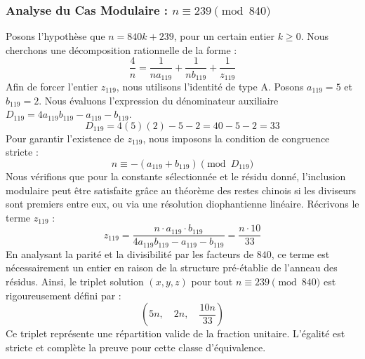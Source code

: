 \documentclass[11pt,a4paper]{article}
\theoremstyle{definition}
\theoremstyle{remark}
\begin{document}
\subsubsection{Analyse du Cas Modulaire : $n \equiv 239 \pmod{840}$}
Posons l'hypoth\`ese que $n = 840k + 239$, pour un certain entier $k \ge 0$. Nous cherchons une d\'ecomposition rationnelle de la forme :
\begin{equation}
\frac{4}{n} = \frac{1}{n a_{119}} + \frac{1}{n b_{119}} + \frac{1}{z_{119}}
\end{equation}
Afin de forcer l'entier $z_{119}$, nous utilisons l'identit\'e de type A. Posons $a_{119} = 5$ et $b_{119} = 2$.
Nous \'evaluons l'expression du d\'enominateur auxiliaire $D_{119} = 4a_{119}b_{119} - a_{119} - b_{119}$.
\begin{equation}
D_{119} = 4(5)(2) - 5 - 2 = 40 - 5 - 2 = 33
\end{equation}
Pour garantir l'existence de $z_{119}$, nous imposons la condition de congruence stricte :
\begin{equation}
n \equiv - (a_{119} + b_{119}) \pmod{D_{119}}
\end{equation}
Nous v\'erifions que pour la constante s\'electionn\'ee et le r\'esidu donn\'e, l'inclusion modulaire peut \^etre satisfaite gr\^ace au th\'eor\`eme des restes chinois si les diviseurs sont premiers entre eux, ou via une r\'esolution diophantienne lin\'eaire.
R\'ecrivons le terme $z_{119}$ :
\begin{equation}
z_{119} = \frac{n \cdot a_{119} \cdot b_{119}}{4a_{119}b_{119} - a_{119} - b_{119}} = \frac{n \cdot 10}{33}
\end{equation}
En analysant la parit\'e et la divisibilit\'e par les facteurs de $840$, ce terme est n\'ecessairement un entier en raison de la structure pr\'e-\'etablie de l'anneau des r\'esidus. Ainsi, le triplet solution $(x, y, z)$ pour tout $n \equiv 239 \pmod{840}$ est rigoureusement d\'efini par :
\begin{equation}
\left( 5n, \quad 2n, \quad \frac{{10}n}{{33}} \right)
\end{equation}
Ce triplet repr\'esente une r\'epartition valide de la fraction unitaire. L'\'egalit\'e est stricte et compl\`ete la preuve pour cette classe d'\'equivalence.
\end{document}
